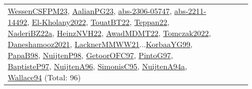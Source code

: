 {\begin{longtable}{p{3cm}r>{\raggedright\arraybackslash}p{6cm}>{\raggedright\arraybackslash}p{6cm}>{\raggedright\arraybackslash}p{8cm}}
\hyperref[detail:WessenCSFPM23]{WessenCSFPM23}, \hyperref[detail:AalianPG23]{AalianPG23}, \hyperref[detail:abs-2306-05747]{abs-2306-05747}, \hyperref[detail:abs-2211-14492]{abs-2211-14492}, \hyperref[detail:El-Kholany2022]{El-Kholany2022}, \hyperref[detail:TouatBT22]{TouatBT22}, \hyperref[detail:Teppan22]{Teppan22}, \hyperref[detail:NaderiBZ22a]{NaderiBZ22a}, \hyperref[detail:HeinzNVH22]{HeinzNVH22}, \hyperref[detail:AwadMDMT22]{AwadMDMT22}, \hyperref[detail:Tomczak2022]{Tomczak2022}, \hyperref[detail:Daneshamooz2021]{Daneshamooz2021}, \hyperref[detail:LacknerMMWW21]{LacknerMMWW21}...\hyperref[detail:KorbaaYG99]{KorbaaYG99}, \hyperref[detail:PapaB98]{PapaB98}, \hyperref[detail:NuijtenP98]{NuijtenP98}, \hyperref[detail:GetoorOFC97]{GetoorOFC97}, \hyperref[detail:PintoG97]{PintoG97}, \hyperref[detail:BaptisteP97]{BaptisteP97}, \hyperref[detail:NuijtenA96]{NuijtenA96}, \hyperref[detail:SimonisC95]{SimonisC95}, \hyperref[detail:NuijtenA94a]{NuijtenA94a}, \hyperref[detail:Wallace94]{Wallace94} (Total: 96)\\

\end{longtable}}
